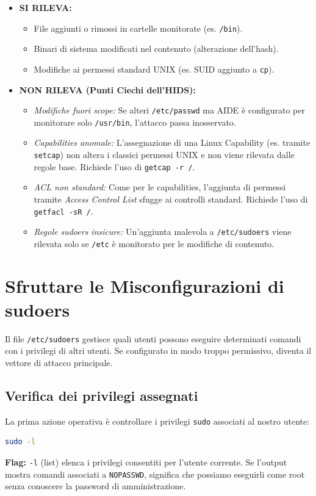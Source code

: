 \documentclass[12pt,a4paper]{report}
\begin{document}
	\begin{itemize}
		\item \textbf{SI RILEVA:}
		\begin{itemize}
			\item File aggiunti o rimossi in cartelle monitorate (es. \texttt{/bin}).
			\item Binari di sistema modificati nel contenuto (alterazione dell'hash).
			\item Modifiche ai permessi standard UNIX (es. SUID aggiunto a \texttt{cp}).
		\end{itemize}
		\item \textbf{NON RILEVA (Punti Ciechi dell'HIDS):}
		\begin{itemize}
			\item \textit{Modifiche fuori scope:} Se alteri \texttt{/etc/passwd} ma AIDE è configurato per monitorare solo \texttt{/usr/bin}, l'attacco passa inosservato.
			\item \textit{Capabilities anomale:} L'assegnazione di una Linux Capability (es. tramite \texttt{setcap}) non altera i classici permessi UNIX e non viene rilevata dalle regole base. Richiede l'uso di \texttt{getcap -r /}.
			\item \textit{ACL non standard:} Come per le capabilities, l'aggiunta di permessi tramite \textit{Access Control List} sfugge ai controlli standard. Richiede l'uso di \texttt{getfacl -sR /}.
			\item \textit{Regole sudoers insicure:} Un'aggiunta malevola a \texttt{/etc/sudoers} viene rilevata solo se \texttt{/etc} è monitorato per le modifiche di contenuto.
		\end{itemize}
	\end{itemize}
	
	\section{Sfruttare le Misconfigurazioni di sudoers}
	
	Il file \texttt{/etc/sudoers} gestisce quali utenti possono eseguire determinati comandi con i privilegi di altri utenti. Se configurato in modo troppo permissivo, diventa il vettore di attacco principale.
	
	\subsection{Verifica dei privilegi assegnati}
	La prima azione operativa è controllare i privilegi \texttt{sudo} associati al nostro utente:
	\begin{lstlisting}[language=bash]
		sudo -l
	\end{lstlisting}
	\textbf{Flag:} \texttt{-l} (list) elenca i privilegi consentiti per l'utente corrente. Se l'output mostra comandi associati a \texttt{NOPASSWD}, significa che possiamo eseguirli come root senza conoscere la password di amministrazione.
	
\end{document}
